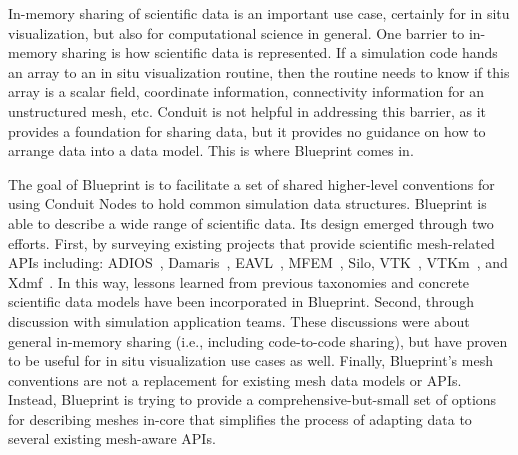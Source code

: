 
%
In-memory sharing of scientific data is an important use case,
certainly for in situ visualization, but also for computational science in general.
%
One barrier to in-memory sharing is how scientific data is represented.
%
If a simulation code hands an array to an in situ visualization routine, then the routine
needs to know if this array is a scalar field, coordinate information, connectivity information
for an unstructured mesh, etc.
%
Conduit is not helpful in addressing this barrier,
as it provides a foundation for sharing data, but it provides no guidance on
how to arrange
data into a data model.
%
This is where Blueprint comes in.
%
%


The goal of Blueprint is to facilitate a set of shared higher-level
conventions for using Conduit Nodes to hold common simulation data structures.
%
Blueprint is able to describe a wide range of scientific data.
%
Its design emerged through two efforts.
%
First, by surveying existing
projects that provide scientific mesh-related APIs including:
ADIOS~\cite{Lofstead2008},
Damaris~\cite{damaris},
EAVL~\cite{EAVL},
MFEM~\cite{mfem-library},
Silo,
VTK~\cite{vtk},
VTKm~\cite{Moreland:CGA2016},
and Xdmf~\cite{xdmf}.
%
In this way, lessons learned from previous taxonomies and concrete scientific data models
have been incorporated in Blueprint.
%
Second, through discussion with simulation application teams.
%
These discussions were about general in-memory sharing (i.e., including code-to-code sharing),
but have proven to be useful for in situ visualization use cases as well.
%
Finally,
Blueprint's mesh conventions are not a replacement for existing mesh data models or APIs.
%
Instead, Blueprint is trying to provide a comprehensive-but-small set of options for
describing meshes in-core that simplifies
the process of adapting data to several existing mesh-aware APIs.



%
%


